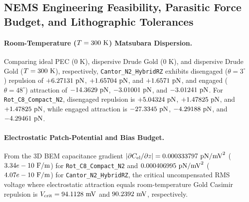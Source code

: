 \subsection{NEMS Engineering Feasibility, Parasitic Force Budget, and Lithographic Tolerances}

\paragraph{Room-Temperature ($T = 300{}\text{ K}$) Matsubara Dispersion.}
Comparing ideal PEC ($0\text{ K}$), dispersive Drude Gold ($0\text{ K}$), and dispersive Drude Gold ($T = 300{}\text{ K}$), respectively, \texttt{Cantor\_N2\_HybridRZ} exhibits disengaged ($\theta=3^\circ$) repulsion of $+6.27131{}\text{ pN}$, $+1.65704{}\text{ pN}$, and $+1.6571{}\text{ pN}$, and engaged ($\theta=48^\circ$) attraction of $-14.3629{}\text{ pN}$, $-3.01001{}\text{ pN}$, and $-3.01241{}\text{ pN}$.
For \texttt{Rot\_C8\_Compact\_N2}, disengaged repulsion is $+5.04324{}\text{ pN}$, $+1.47825{}\text{ pN}$, and $+1.47825{}\text{ pN}$, while engaged attraction is $-27.3345{}\text{ pN}$, $-4.29188{}\text{ pN}$, and $-4.29461{}\text{ pN}$.

\paragraph{Electrostatic Patch-Potential and Bias Budget.}
From the 3D BEM capacitance gradient $|\partial C_{\rm el}/\partial z| = 0.000333797{}\text{ pN/mV}^2$ ($3.34e-10{}\text{ F/m}$) for \texttt{Rot\_C8\_Compact\_N2} and $0.000406995{}\text{ pN/mV}^2$ ($4.07e-10{}\text{ F/m}$) for \texttt{Cantor\_N2\_HybridRZ}, the critical uncompensated RMS voltage where electrostatic attraction equals room-temperature Gold Casimir repulsion is $V_{\rm crit} = 94.1128{}\text{ mV}$ and $90.2392{}\text{ mV}$, respectively.

